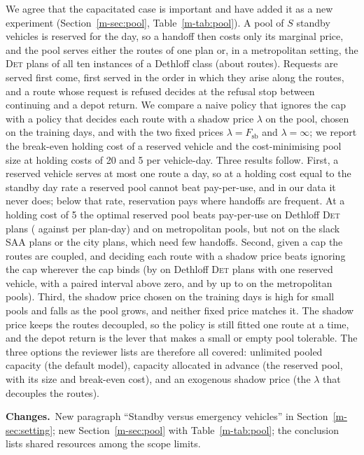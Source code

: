 \documentclass[11pt]{article}
\newcommand{\chg}{\par\noindent\textbf{Changes.}\ }
\newcommand{\sref}[1]{Section~\ref{m-#1}}
\newcommand{\tref}[1]{Table~\ref{m-#1}}
\begin{document}
We agree that the capacitated case is important and have added it as a
new experiment (\sref{sec:pool}, \tref{tab:pool}). A pool of $S$
standby vehicles is reserved for the day, so a handoff then costs only
its marginal price, and the pool serves either the routes of one plan
or, in a metropolitan setting, the \textsc{Det} plans of all ten
instances of a Dethloff class (about \poolMetroK{} routes). Requests are
served first come, first served in the order in which they arise along
the routes, and a route whose request is refused decides at the refusal
stop between continuing and a depot return. We compare a naive policy
that ignores the cap with a policy that decides each route with a shadow
price $\lambda$ on the pool, chosen on the training days, and with the
two fixed prices $\lambda = F_{\mathrm{sb}}$ and $\lambda = \infty$; we
report the break-even holding cost of a reserved vehicle and the
cost-minimising pool size at holding costs of 20 and 5 per vehicle-day.
Three results follow. First, a reserved vehicle serves at most one route
a day, so at a holding cost equal to the standby day rate a reserved pool
cannot beat pay-per-use, and in our data it never does; below that rate,
reservation pays where handoffs are frequent. At a holding cost of 5 the
optimal reserved pool beats pay-per-use on \poolDethBeatLow{} Dethloff
\textsc{Det} plans (\poolDethTotLow{} against \poolDethPpu{} per plan-day)
and on \poolMetroBeatLow{} metropolitan pools, but not on the slack
\textsc{SAA} plans or the city plans, which need few handoffs. Second,
given a cap the routes are coupled, and deciding each route with a
shadow price beats ignoring the cap wherever the cap binds (by
\poolDethGainOne{} on Dethloff \textsc{Det} plans with one reserved
vehicle, with a paired interval above zero, and by up to
\poolMetroGainMax{} on the metropolitan pools). Third, the shadow price
chosen on the training days is high for small pools and falls as the
pool grows, and neither fixed price matches it. The shadow price keeps
the routes decoupled, so the policy is still fitted one route at a time,
and the depot return is the lever that makes a small or empty pool
tolerable. The three options the reviewer lists are therefore all
covered: unlimited pooled capacity (the default model), capacity
allocated in advance (the reserved pool, with its size and break-even
cost), and an exogenous shadow price (the $\lambda$ that decouples the
routes).
\chg New paragraph ``Standby versus emergency vehicles'' in
\sref{sec:setting}; new \sref{sec:pool} with
\tref{tab:pool}; the conclusion lists shared resources among the scope
limits.
\end{document}
